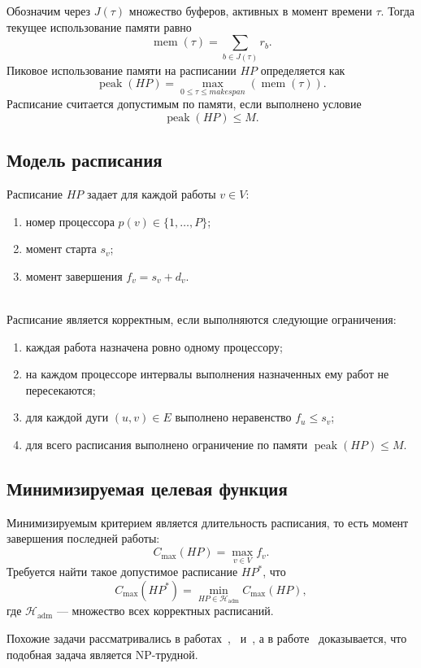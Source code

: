 Обозначим через $J(\tau)$ множество буферов, активных в момент времени $\tau$. Тогда текущее использование памяти равно
\[
\operatorname{mem}(\tau) = \sum_{b \in J(\tau)} r_b.
\]
Пиковое использование памяти на расписании $HP$ определяется как
\[
\operatorname{peak}(HP) = \max_{0 \le \tau \le makespan} (\operatorname{mem}(\tau)).
\]
Расписание считается допустимым по памяти, если выполнено условие
\[
\operatorname{peak}(HP) \le M.
\]

\subsection{Модель расписания}
Расписание $HP$ задает для каждой работы $v \in V$:
\begin{enumerate}
	\item номер процессора $p(v) \in \{1, \dots, P\}$;
	\item момент старта $s_v$;
	\item момент завершения $f_v = s_v + d_v$.\\\\
\end{enumerate}

Расписание является корректным, если выполняются следующие ограничения:
\begin{enumerate}
	\item каждая работа назначена ровно одному процессору;
	\item на каждом процессоре интервалы выполнения назначенных ему работ не пересекаются;
	\item для каждой дуги $(u, v) \in E$ выполнено неравенство $f_u \le s_v$;
	\item для всего расписания выполнено ограничение по памяти $\operatorname{peak}(HP) \le M$.
\end{enumerate}

\subsection{Минимизируемая целевая функция}
Минимизируемым критерием является длительность расписания, то есть момент завершения последней работы:
\[
C_{\max}(HP) = \max_{v \in V} f_v.
\]
Требуется найти такое допустимое расписание $HP^*$, что
\[
C_{\max}(HP^*) = \min_{HP \in \mathcal{H}_{\text{adm}}} C_{\max}(HP),
\]
где $\mathcal{H}_{\text{adm}}$ — множество всех корректных расписаний.

Похожие задачи рассматривались в работах~\cite{Wang2010},~\cite{Herrmann2014} и~\cite{Venugopalan2012}, а в работе~\cite{Papp2025} доказывается, что подобная задача является NP-трудной.